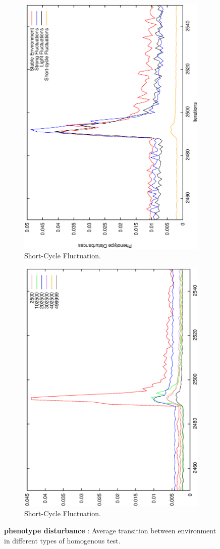 \begin{figure}[H]
\begin{subfigure}{.25\textwidth}
  \centering
  \includegraphics[width=.7\linewidth, angle =-90]{img/Failavg499999variationSmallb.eps}
  \caption{Short-Cycle Fluctuation.}
  \label{fig:transstest}
\end{subfigure}%
\begin{subfigure}{.25\textwidth}
  \centering
  \includegraphics[width=.7\linewidth, angle =-90]{img/FailavgvarSmallValidvariationSmallb.eps}
  \caption{Short-Cycle Fluctuation.}
  \label{fig:transonly}
\end{subfigure}
\caption{\textbf{phenotype disturbance} : Average transition between environment in different types of homogenous test.}
\label{fig:trans}
\end{figure}


